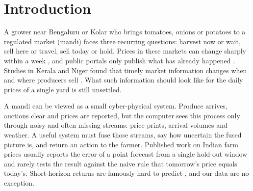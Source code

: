 \documentclass[runningheads]{llncs}
\begin{document}
\section{Introduction}
A grower near Bengaluru or Kolar who brings tomatoes, onions or potatoes to a regulated market (mandi) faces three recurring questions: harvest now or wait, sell here or travel, sell today or hold. Prices in these markets can change sharply within a week \cite{birthal2019}, and public portals only publish what has already happened \cite{agmarknet}. Studies in Kerala and Niger found that timely market information changes when and where producers sell \cite{jensen2007,aker2010}. What such information should look like for the daily prices of a single yard is still unsettled.

A mandi can be viewed as a small cyber-physical system. Produce arrives, auctions clear and prices are reported, but the computer sees this process only through noisy and often missing streams: price prints, arrival volumes and weather. A useful system must fuse those streams, say how uncertain the fused picture is, and return an action to the farmer. Published work on Indian farm prices usually reports the error of a point forecast from a single hold-out window \cite{ray2023,meena2024,jha2014} and rarely tests the result against the naive rule that tomorrow's price equals today's. Short-horizon returns are famously hard to predict \cite{fama1970}, and our data are no exception.
\end{document}
